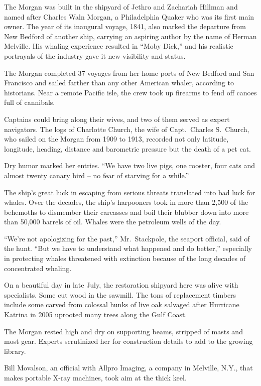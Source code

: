 ﻿\documentclass[12pt]{article}
\begin{document}
The Morgan was built in the shipyard of Jethro and Zachariah Hillman and named after Charles Waln
Morgan, a Philadelphia Quaker who was its first main owner. The year of its inaugural voyage, 1841,
also marked the departure from New Bedford of another ship, carrying an aspiring author by the name
of Herman Melville. His whaling experience resulted in ``Moby Dick,'' and his realistic portrayals
of the industry gave it new visibility and status.

The Morgan completed 37 voyages from her home ports of New Bedford and San Francisco and sailed
farther than any other American whaler, according to historians. Near a remote Pacific isle, the
crew took up firearms to fend off canoes full of cannibals.

Captains could bring along their wives, and two of them served as expert navigators. The logs of
Charlotte Church, the wife of Capt.~Charles S.~Church, who sailed on the Morgan from 1909 to 1913,
recorded not only latitude, longitude, heading, distance and barometric pressure but the death of a
pet cat.

Dry humor marked her entries. ``We have two live pigs, one rooster, four cats and almost twenty
canary bird -- no fear of starving for a while.''

The ship's great luck in escaping from serious threats translated into bad luck for whales. Over the
decades, the ship's harpooners took in more than 2,500 of the behemoths to dismember their carcasses
and boil their blubber down into more than 50,000 barrels of oil. Whales were the petroleum wells of
the day.

``We're not apologizing for the past,'' Mr.~Stackpole, the seaport official, said of the hunt. ``But
we have to understand what happened and do better,'' especially in protecting whales threatened with
extinction because of the long decades of concentrated whaling.

On a beautiful day in late July, the restoration shipyard here was alive with specialists. Some cut
wood in the sawmill. The tons of replacement timbers include some carved from colossal hunks of live
oak salvaged after Hurricane Katrina in 2005 uprooted many trees along the Gulf Coast.

The Morgan rested high and dry on supporting beams, stripped of masts and most gear. Experts
scrutinized her for construction details to add to the growing library.

Bill Movalson, an official with Allpro Imaging, a company in Melville, N.Y., that makes portable
X-ray machines, took aim at the thick keel.
\end{document}
